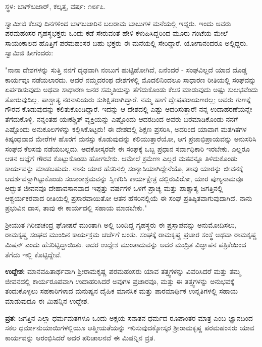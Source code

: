 \begin{center}
ಸ್ಥಳ: ಬಾಗ್‌ಬಜಾರ್, ಕಲ್ಕತ್ತ, ವರ್ಷ: ೧೮೯೭.
\end{center}

ಸ್ವಾಮೀಜಿ ಕೆಲವು ದಿನಗಳಿಂದ ಬಾಗಬಜಾರಿನ ಬಲರಾಮ ಬಾಬುಗಳ ಮನೆಯಲ್ಲಿ ಇದ್ದರು. ಇಂದು ಅವರು ಪರಮಹಂಸರ ಗೃಹಸ್ಥಭಕ್ತರು ಒಂದು ಕಡೆ ಸೇರುವಂತೆ ಹೇಳಿ ಕಳುಹಿಸಿದ್ದರಿಂದ ಮೂರು ಗಂಟೆಯ ಮೇಲೆ ಸಾಯಂಕಾಲದ ಹೊತ್ತಿಗೆ ಪರಮಹಂಸರ ಬಹು ಭಕ್ತರು ಈ ಮನೆಯಲ್ಲಿ ಸೇರಿದ್ದಾರೆ. ಯೋಗಾನಂದರೂ ಅಲ್ಲಿದ್ದರು. ಸ್ವಾಮಿಜಿ ಹೀಗೆಂದರು:

"ನಾನಾ ದೇಶಗಳನ್ನು ಸುತ್ತಿ ನನಗೆ ದೃಢವಾಗಿ ನಂಬುಗೆ ಹುಟ್ಟಿಹೋಗಿದೆ, ಏನೆಂದರೆ - ಸಂಘವಿಲ್ಲದೆ ಯಾವ ದೊಡ್ಡ ಕಾರ್ಯವೂ ನಡೆಯಲಾರದು. ಆದರೆ ನಮ್ಮದರಂಥ ದೇಶಗಳಲ್ಲಿ ಮೊದಲಿನಿಂದಲೂ ಸಾಧಾರಣ ರೀತಿಯಲ್ಲಿ ಸಂಘವನ್ನು ಏರ್ಪಡಿಸುವುದು ಅಥವಾ ಸಾಧಾರಣ ಜನರ ಸಮ್ಮತಿಯನ್ನು ತೆಗೆದುಕೊಂಡು ಕೆಲಸ ಮಾಡುವುದು ಅಷ್ಟು ಸುಲಭವೆಂದು ತೋರುವುದಿಲ್ಲ. ಪಾಶ್ಚಾತ್ಯ ನರನಾರಿಯರು ಸುಶಿಕ್ಷಿತರಾಗಿದ್ದಾರೆ. ನಮ್ಮ ಹಾಗೆ ದ್ವೇಷಪರಾಯಣರಲ್ಲ; ಅವರು ಗುಣಕ್ಕೆ ಗೌರವ ಕೊಡುವುದನ್ನು ಕಲಿತುಕೊಂಡಿದ್ದಾರೆ. ಇದನ್ನು ಆ ದೇಶದಲ್ಲಿ ಎಷ್ಟು ಆದರಿಸುತ್ತಾರೆ! ನನ್ನ ಉದಾಹರಣೆಯನ್ನೇ ತೆಗೆದುಕೊಳ್ಳಿ. ನನ್ನಂತಹ ಯಃಕಶ್ಚಿತ್ ವ್ಯಕ್ತಿಯನ್ನು ಎಷ್ಟೊಂದು ಆದರದಿಂದ ಅವರು ಬರಮಾಡಿಕೊಂಡು ನನಗೆ ಎಷ್ಟೊಂದು ಅನುಕೂಲಗಳನ್ನು ಕಲ್ಪಿಸಿಕೊಟ್ಟರು! ಈ ದೇಶದಲ್ಲಿ ಶಿಕ್ಷಣ ಪ್ರಸರಿಸಿ, ಅದರಿಂದ ಯಾವಾಗ ಮತಗಿತಗಳ ಕಿಷ್ಕಂಧವಾದ ಮೇರೆಗಳ ಹೊರಗೆ ಮನಸ್ಸು ಕೊಡುವುದನ್ನು ಕಲಿಯುತ್ತಾರೆಯೋ, ಆಗ ಪ್ರಜಾಭಿಪ್ರಾಯವನ್ನು ಅನುಸರಿಸಿ ಸಂಘದ ಕೆಲಸವು ನಡೆಯಬಲ್ಲದು. ಅದಕೋಸ್ಕರವೇ ಈ ಸಂಘಕ್ಕೆ ಒಬ್ಬ ಪ್ರಧಾನ ಸರ್ವಾಧಿಕಾರಿ ಇರಬೇಕು. ಎಲ್ಲರೂ ಆತನ ಆಜ್ಞೆಗೆ ಗೌರವ ಕೊಟ್ಟುಕೊಂಡು ಹೋಗಬೇಕು. ಆಮೇಲೆ ಕ್ರಮೇಣ ಎಲ್ಲರ ಮತವನ್ನೂ ತಿಳಿದುಕೊಂಡು ಕಾರ್ಯವನ್ನು ಮಾಡಬಹುದು. ನಾನು ಯಾರ ಹೆಸರಿನಲ್ಲಿ ಸಂನ್ಯಾಸಿಯಾಗಿದ್ದೇನೆಯೊ, ತಾವು ಯಾರನ್ನು ಜೀವನಕ್ಕೆ ಆದರ್ಶವನ್ನಾಗಿಟ್ಟುಕೊಂಡು ಸಂಸಾರಾಶ್ರಮವನ್ನು ಸ್ವೀಕರಿಸಿ ಕಾರ್ಯಕ್ಷೇತ್ರ ದಲ್ಲಿರುವಿರೋ, ಯಾರ ಪುಣ್ಯನಾಮವೂ ಅದ್ಭುತ ಜೀವನವೂ ದೇಹಾವಸಾನವಾದ ಇಪ್ಪತ್ತು ವರ್ಷಗಳ ಒಳಗೆ ಪ್ರಾಚ್ಯ ಮತ್ತು ಪಾಶ್ಚಾತ್ಯ ಜಗತ್ತಿನಲ್ಲಿ ಆಶ್ಚರ್ಯಕರವಾದ ರೀತಿಯಲ್ಲಿ ಪ್ರಸಾರವಾಯಿತೋ ಆತನ ಹೆಸರಿನಲ್ಲಿಯೆ ಈ ಸಂಘ ಪ್ರತಿಷ್ಠಿತವಾಗುವುದಾಗಿದೆ. ನಾನು ಪ್ರಭುವಿನ ದಾಸ, ತಾವು ಈ ಕಾರ್ಯದಲ್ಲಿ ಸಹಾಯ ಮಾಡಬೇಕು."

ಶ‍್ರೀಯುತ ಗಿರೀಶಚಂದ್ರ ಘೋಷರೆ ಮುಂತಾಗಿ ಅಲ್ಲಿ ಬಂದಿದ್ದ ಗೃಹಸ್ಥರು ಈ ಪ್ರಸ್ತಾಪವನ್ನು ಅನುಮೋದಿಸಲು, ರಾಮಕೃಷ್ಣ ಸಂಘದ ಮುಂದಿನ ಕಾರ್ಯಕ್ರಮ ಚರ್ಚೆಗೆ ಬಂತು. ಸಂಘಕ್ಕೆ ರಾಮಕೃಷ್ಣ ಪ್ರಚಾರ ಸಂಸ್ಥೆ ಅಥವಾ ರಾಮಕೃಷ್ಣ ಮಿಷನ್ ಎಂದು ಹೆಸರಿಟ್ಟಿದ್ದಾಯಿತು. ಅದರ ಉದ್ದೇಶ ಮುಂತಾದುವನ್ನು ಅದರ ಮುದ್ರಿತ ವಿಜ್ಞಾಪನ ಪತ್ರಿಕೆಯಿಂದ ತೆಗೆದು ಇಲ್ಲಿ ಕೊಟ್ಟಿದ್ದೇವೆ.

\textbf{ಉದ್ದೇಶ:} ಮಾನವಹಿತಾರ್ಥವಾಗಿ ಶ‍್ರೀರಾಮಕೃಷ್ಣ ಪರಮಹಂಸರು ಯಾವ ತತ್ತ್ವಗಳನ್ನು ವಿವರಿಸಿದರೆ ಮತ್ತು ತಮ್ಮ ಜೀವನದಲ್ಲಿ ಕಾರ್ಯರೂಪವಾಗಿ ಉದಾಹರಿಸಿದರೆ ಅವುಗಳ ಪ್ರಚಾರವೂ, ಮತ್ತು ಈ ತತ್ತ್ವಗಳನ್ನು ಅನುಭವಕ್ಕೆ ತಂದುಕೊಳ್ಳಲು ಸಹಕಾರಿಗಳಾದ ಮನುಷ್ಯನ ದೈಹಿಕ ಮಾನಸಿಕ ಮತ್ತು ಪಾರಮಾರ್ಥಿಕ ಉನ್ನತಿಗಳಲ್ಲಿ ಸಹಾಯ ಮಾಡುವುದೂ ಈ ಮಿಷನ್ನಿನ ಉದ್ದೇಶ.

\textbf{ವ್ರತ:} ಜಗತ್ತಿನ ಎಲ್ಲಾ ಧರ್ಮಮತಗಳೂ ಒಂದು ಅಕ್ಷಯ ಸನಾತನ ಧರ್ಮದ ರೂಪಾಂತರ ಮಾತ್ರ ಎಂಬ ಜ್ಞಾನದಿಂದ ಸಕಲ ಧರ್ಮಾನುಯಾಯಿಗಳಲ್ಲಿಯೂ ಆತ್ಮೀಯತೆಯನ್ನು ಇರಿಸುವುದಕ್ಕೋಸ್ಕರ ಶ‍್ರೀರಾಮಕೃಷ್ಣ ಪರಮಹಂಸರು ಯಾವ ಕಾರ್ಯವನ್ನು ಆರಂಭಿಸಿದರೆ ಅದರ ಪರಿಚಾಲನವೆ ಈ ಮಿಷನ್ನಿನ ವ್ರತ.

